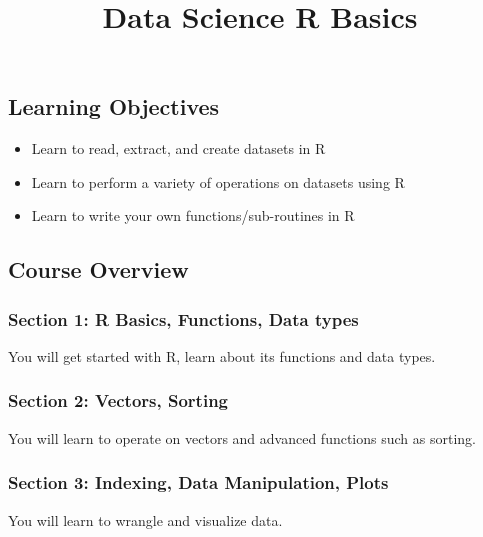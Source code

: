 \documentclass[]{article}
\title{Data Science R Basics}
\author{}
\date{\vspace{-2.5em}}
\providecommand{\tightlist}{%
  \setlength{\itemsep}{0pt}\setlength{\parskip}{0pt}}
\begin{document}
\maketitle

\hypertarget{learning-objectives}{%
\subsection{Learning Objectives}\label{learning-objectives}}

\begin{itemize}
\tightlist
\item
  Learn to read, extract, and create datasets in R
\item
  Learn to perform a variety of operations on datasets using R
\item
  Learn to write your own functions/sub-routines in R
\end{itemize}

\hypertarget{course-overview}{%
\subsection{Course Overview}\label{course-overview}}

\hypertarget{section-1-r-basics-functions-data-types}{%
\subsubsection{Section 1: R Basics, Functions, Data
types}\label{section-1-r-basics-functions-data-types}}

You will get started with R, learn about its functions and data types.

\hypertarget{section-2-vectors-sorting}{%
\subsubsection{Section 2: Vectors,
Sorting}\label{section-2-vectors-sorting}}

You will learn to operate on vectors and advanced functions such as
sorting.

\hypertarget{section-3-indexing-data-manipulation-plots}{%
\subsubsection{Section 3: Indexing, Data Manipulation,
Plots}\label{section-3-indexing-data-manipulation-plots}}

You will learn to wrangle and visualize data.
\end{document}
